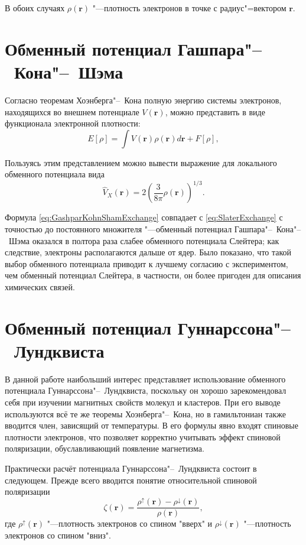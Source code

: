 В обоих случаях $\rho(\mathbf{r})$ "---плотность электронов в точке с радиус"=вектором $\mathbf{r}$.

\section{\textbf{Обменный потенциал Гашпара"--~Кона"--~Шэма}}
Согласно теоремам Хоэнберга"--~Кона полную энергию системы электронов, находящихся во внешнем
потенциале $V(\mathbf{r})$, можно представить в виде функционала электронной плотности\cite{Hohenberg}:
\begin{equation}
  E[\rho] = \int{ V(\mathbf{r}) \rho(\mathbf{r}) d\mathbf{r} } + F[\rho],
\end{equation}

Пользуясь этим представлением можно вывести\cite{Gaspar}\cite{Kohn} выражение для локального обменного потенциала вида
\begin{equation}\label{eq:GashparKohnShamExchange}
  \widehat{V}_X(\mathbf{r}) = 2 \left(
    \frac{ 3 }{ 8 \pi }
    \rho(\mathbf{r})
  \right)^{1/3}.
\end{equation}

Формула \eqref{eq:GashparKohnShamExchange} совпадает с \eqref{eq:SlaterExchange}
с точностью до постоянного множителя "---обменный потенциал Гашпара"--~Кона"--~Шэма
оказался в полтора раза слабее обменного потенциала Слейтера; как следствие, электроны располагаются
дальше от ядер. Было показано, что такой выбор обменного потенциала приводит к
лучшему согласию с экспериментом, чем обменный потенциал Слейтера, в частности, он более пригоден для описания
химических связей\cite{nyavro}.

\section{\textbf{Обменный потенциал Гуннарссона"--~Лундквиста}}
В данной работе наибольший интерес представляет использование обменного потенциала Гуннарссона"--~Лундквиста\cite{GUNNARSSON1976177},
поскольку
он хорошо зарекомендовал себя при изучении магнитных свойств молекул и кластеров\cite{nyavro}. При его выводе используются
всё те же теоремы Хоэнберга"--~Кона, но в гамильтониан также вводится член, зависящий от температуры. В его формулы
явно входят спиновые плотности электронов, что позволяет корректно учитывать эффект спиновой поляризации, обуславливающий появление магнетизма.

Практически расчёт потенциала Гуннарссона"--~Лундквиста состоит в следующем. Прежде всего вводится понятие относительной спиновой поляризации
\begin{equation}
  \zeta(\mathbf{r}) = \frac{\rho^\uparrow({\mathbf{r}}) - \rho^\downarrow({\mathbf{r}})}{\rho({\mathbf{r}})},
\end{equation}
где $\rho^\uparrow({\mathbf{r}})$ "---плотность электронов со спином "вверх" и $\rho^\downarrow({\mathbf{r}})$
"---плотность электронов со спином "вниз".

